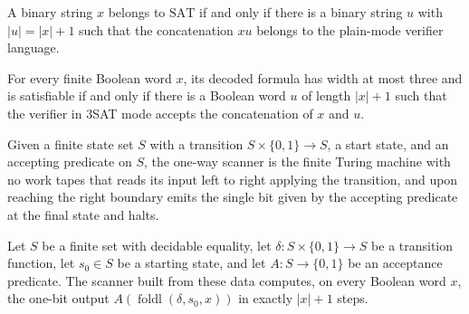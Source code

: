 \begin{lemma}
\label{Complexity.sat_verifier_equiv}
\leanok
{}
A binary string $x$ belongs to $\mathrm{SAT}$ if and only if there is a binary string
$u$ with $|u|=|x|+1$ such that the concatenation $xu$ belongs to the plain-mode verifier
language.
\end{lemma}

\begin{lemma}
\label{Complexity.sat3_verifier_equiv}
\leanok
{}
For every finite Boolean word $x$, its decoded formula has width at most three and is
satisfiable if and only if there is a Boolean word $u$ of length $|x|+1$ such that the
verifier in 3SAT mode accepts the concatenation of $x$ and $u$.
\end{lemma}

\begin{definition}
\label{Complexity.satScanTM}
\leanok
{}
Given a finite state set $S$ with a transition $S \times \{0,1\} \to S$, a start
state, and an accepting predicate on $S$, the one-way scanner is the finite Turing
machine with no work tapes that reads its input left to right applying the
transition, and upon reaching the right boundary emits the single bit given by the
accepting predicate at the final state and halts.
\end{definition}

\begin{lemma}
\label{Complexity.satScan_computes}
\leanok
{}
Let $S$ be a finite set with decidable equality, let $\delta:S\times\{0,1\}\to S$ be a
transition function, let $s_0\in S$ be a starting state, and let $A:S\to\{0,1\}$ be an
acceptance predicate. The scanner built from these data computes, on every Boolean word
$x$, the one-bit output $A(\operatorname{foldl}(\delta,s_0,x))$ in exactly $|x|+1$
steps.
\end{lemma}

